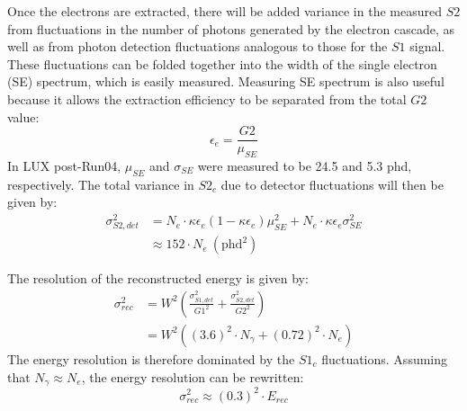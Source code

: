 Once the electrons are extracted, there will be added variance in the measured $S2$ from fluctuations in the number of photons generated by the electron cascade, as well as from photon detection fluctuations analogous to those for the $S1$ signal. These fluctuations can be folded together into the width of the single electron (SE) spectrum, which is easily measured. Measuring  SE spectrum is also useful because it allows the extraction efficiency to be separated from the total $G2$ value:
\begin{equation}
\epsilon_e=\frac{G2}{\mu_{SE}}
\end{equation}
In LUX post-Run04, $\mu_{SE}$ and $\sigma_{SE}$ were measured to be 24.5 and 5.3 phd, respectively. The total variance in $S2_c$ due to detector fluctuations will then be given by:
\begin{equation} 
\begin{split}
\sigma_{S2,det}^2&=N_e\cdot \kappa\epsilon_e(1-\kappa\epsilon_e)\mu_{SE}^2+N_e\cdot\kappa\epsilon_e\sigma_{SE}^2\\
&\approx 152 \cdot N_e \ (\text{phd}^2)
\end{split}
\end{equation}
 
The resolution of the reconstructed energy is given by:
\begin{equation}
\begin{split}
\sigma_{rec}^2&=W^2\left(\frac{\sigma_{S1,det}^2}{G1^2}+\frac{\sigma_{S2,det}^2}{G2^2}\right)\\[1em]
&=W^2\left((3.6)^2\cdot N_{\gamma}+(0.72)^2\cdot N_e \right)
\end{split}
\end{equation}
The energy resolution is therefore dominated by the $S1_c$ fluctuations. Assuming that $N_{\gamma}\approx N_e$, the energy resolution can be rewritten:
\begin{equation}
\sigma_{rec}^2\approx (0.3)^2\cdot E_{rec}
\end{equation}


